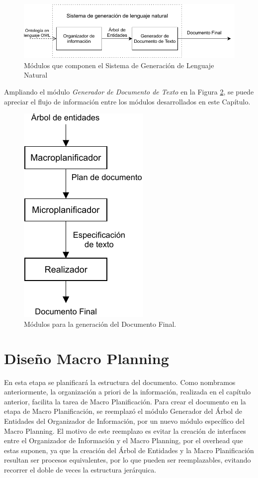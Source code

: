 \begin{figure}
    \centering
    \includegraphics{img/presentacion_problema/modulos_sgln.pdf}
    \caption{Módulos que componen el Sistema de Generación de Lenguaje Natural}
    \label{fig:modulos_sgln}
\end{figure}


Ampliando el módulo \emph{Generador de Documento de Texto} en la Figura \ref{fig:modulos_documento_final}, se puede apreciar el flujo de información entre los módulos desarrollados en este Capítulo.

\begin{figure}
    \centering
    \includegraphics{img/generacion_documento/modulos_documento_final.pdf}
    \caption{Módulos para la generación del Documento Final.}
    \label{fig:modulos_documento_final}
\end{figure}


\section{Diseño Macro Planning}
\label{sec:macro_planning}
En esta etapa se planificará la estructura del documento. Como nombramos anteriormente, la organización a priori de la información, realizada en el capítulo anterior, facilita la tarea de Macro Planificación. Para crear el documento en la etapa de Macro Planificación, se reemplazó el módulo Generador del Árbol de Entidades del Organizador de Información, por un nuevo módulo específico del Macro Planning. El motivo de este reemplazo es evitar la creación de interfaces entre el Organizador de Información y el Macro Planning, por el overhead que estas suponen, ya que la creación del Árbol de Entidades y la Macro Planificación resultan ser procesos equivalentes, por lo que pueden ser reemplazables, evitando recorrer el doble de veces la estructura jerárquica.

